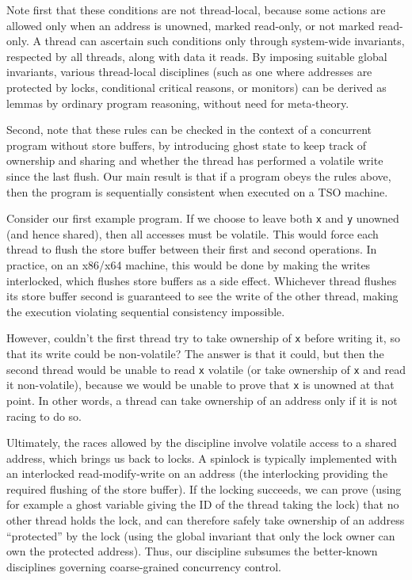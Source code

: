 \documentclass[11pt]{llncs}
\begin{document}
Note first that these conditions are not thread-local, because some actions
are allowed only when an address is unowned, marked read-only, or not
marked read-only. A thread can ascertain such conditions only through
system-wide invariants, respected by all threads, along with data it
reads. By imposing suitable global invariants, various thread-local
disciplines (such as one where addresses are protected by locks,
conditional critical reasons, or monitors) can be derived as lemmas by
ordinary program reasoning, without need for meta-theory.

Second, note that these rules can be checked in the context of a
concurrent program without store buffers, by introducing ghost state
to keep track of ownership and sharing and whether the thread has performed a volatile write
since the last flush. Our main result is that if a program obeys the rules
above, then the program is sequentially consistent when executed on a
TSO machine.

Consider our first example program. If we choose to leave both
\texttt{x} and \texttt{y} unowned (and hence shared), then all accesses must be volatile.
This would force each thread to flush the store buffer between their
first and second operations.  In practice, on an x86/x64 machine, this
would be done by making the writes interlocked, which flushes store
buffers as a side effect.  Whichever thread flushes its store buffer
second is guaranteed to see the write of the other thread, making the
execution violating sequential consistency impossible.

However, couldn't the first thread try to take ownership of \texttt{x}
before writing it, so that its write could be non-volatile? The answer
is that it could, but then the second thread would be unable to read
\texttt{x} volatile (or take ownership of \texttt{x} and read it
non-volatile), because we would be unable to prove that \texttt{x} is
unowned at that point.  In other words, a thread can take ownership of
an address only if it is not racing to do so.

Ultimately, the races allowed by the discipline involve volatile
access to a shared address, which brings us back to locks.  A spinlock
is typically implemented with an interlocked read-modify-write on an
address (the interlocking providing the required flushing of the store
buffer).  If the locking succeeds, we can prove (using for example a
ghost variable giving the ID of the thread taking the lock) that no
other thread holds the lock, and can therefore safely take ownership
of an address ``protected'' by the lock (using the global invariant
that only the lock owner can own the protected address).  Thus, our
discipline subsumes the better-known disciplines governing
coarse-grained concurrency control.
\end{document}
